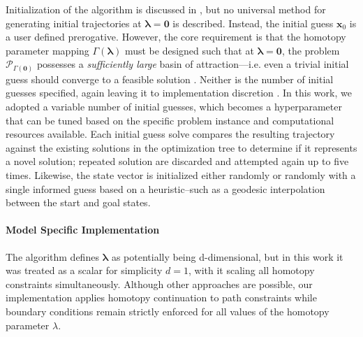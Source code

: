 Initialization of the algorithm is discussed in \cite{Pardis24}, but no universal method for generating initial trajectories at $\boldsymbol{\lambda} = \mathbf{0}$ is described.
Instead, the initial guess $\mathbf{x}_0$ is a user defined prerogative.
However, the core requirement is that the homotopy parameter mapping $\Gamma(\boldsymbol{\lambda})$ must be designed such that at $\boldsymbol{\lambda} = \mathbf{0}$, the problem $\mathcal{P}_{\Gamma(\mathbf{0})}$ possesses a \emph{sufficiently large} basin of attraction---i.e. even a trivial initial guess should converge to a feasible solution \cite{Pardis24}.
Neither is the number of initial guesses specified, again leaving it to implementation discretion \cite{Pardis24}.
In this work, we adopted a variable number of initial guesses, which becomes a hyperparameter that can be tuned based on the specific problem instance and computational resources available.
Each initial guess solve compares the resulting trajectory against the existing solutions in the optimization tree to determine if it represents a novel solution; 
repeated solution are discarded and attempted again up to five times.
Likewise, the state vector is initialized either randomly or randomly with a single informed guess based on a heuristic--such as a geodesic interpolation between the start and goal states.

\paragraph{Model Specific Implementation}

The algorithm defines $\boldsymbol{\lambda}$ as potentially being d-dimensional, but in this work it was treated as a scalar for simplicity $d=1$, with it scaling all homotopy constraints simultaneously.
Although other approaches are possible, our implementation applies homotopy continuation to path constraints while boundary conditions remain strictly enforced for all values of the homotopy parameter $\lambda$.

